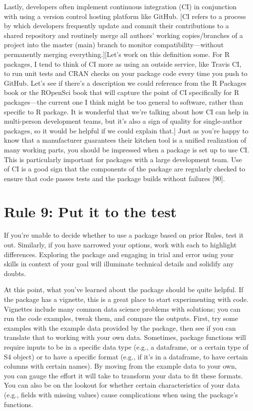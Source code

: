 \documentclass[10pt,letterpaper]{article}
\begin{document}
Lastly, developers often implement continuous integration (CI) in
conjunction with using a version control hosting platform like GitHub.
{[}CI refers to a process by which developers frequently update and
commit their contributions to a shared repository and routinely merge
all authors' working copies/branches of a project into the master (main)
branch to monitor compatibility---without permanently merging
everything.{]}{[}Let's work on this definition some. For R packages, I
tend to think of CI more as using an outside service, like Travis CI, to
run unit tests and CRAN checks on your package code every time you push
to GitHub. Let's see if there's a description we could reference from
the R Packages book or the ROpenSci book that will capture the point of
CI specifically for R packages---the current one I think might be too
general to software, rather than specific to R package. It is wonderful
that we're talking about how CI can help in multi-person development
teams, but it's also a sign of quality for single-author packages, so it
would be helpful if we could explain that.{]} Just as you're happy to
know that a manufacturer guarantees their kitchen tool is a unified
realization of many working parts, you should be impressed when a
package is set up to use CI. This is particularly important for packages
with a large development team. Use of CI is a good sign that the
components of the package are regularly checked to ensure that code
passes tests and the package builds without failures {[}90{]}.

\hypertarget{rule-9-put-it-to-the-test}{%
\section{Rule 9: Put it to the test}\label{rule-9-put-it-to-the-test}}

If you're unable to decide whether to use a package based on prior
Rules, test it out. Similarly, if you have narrowed your options, work
with each to highlight differences. Exploring the package and engaging
in trial and error using your skills in context of your goal will
illuminate technical details and solidify any doubts.

At this point, what you've learned about the package should be quite
helpful. If the package has a vignette, this is a great place to start
experimenting with code. Vignettes include many common data science
problems with solutions; you can run the code examples, tweak them, and
compare the outputs. First, try some examples with the example data
provided by the package, then see if you can translate that to working
with your own data. Sometimes, package functions will require inputs to
be in a specific data type (e.g., a dataframe, or a certain type of S4
object) or to have a specific format (e.g., if it's in a dataframe, to
have certain columns with certain names). By moving from the example
data to your own, you can gauge the effort it will take to transform
your data to fit these formats. You can also be on the lookout for
whether certain characteristics of your data (e.g., fields with missing
values) cause complications when using the package's functions.
\end{document}

